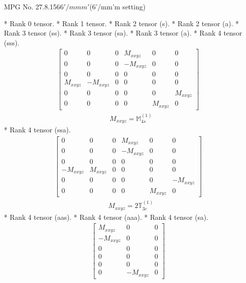 \documentclass[fleqn,8pt,landscape]{jsarticle}
\begin{document}
\setcounter{MaxMatrixCols}{32}

\renewcommand{\tablename}{Table~}
\renewcommand{\figurename}{Figure~}
\begin{center}
\LARGE
MPG No. 27.8.156\quad$6'/mmm'$\quad(6'/mm'm setting)
\end{center}
* Rank 0 tensor.
* Rank 1 tensor.
* Rank 2 tensor (s).
* Rank 2 tensor (a).
* Rank 3 tensor (ss).
* Rank 3 tensor (sa).
* Rank 3 tensor (a).
* Rank 4 tensor (sss).
\begin{align*}
\begin{bmatrix} 0 & 0 & 0 & M_{xxyz} & 0 & 0 \\ 0 & 0 & 0 & - M_{xxyz} & 0 & 0 \\ 0 & 0 & 0 & 0 & 0 & 0 \\ M_{xxyz} & - M_{xxyz} & 0 & 0 & 0 & 0 \\ 0 & 0 & 0 & 0 & 0 & M_{xxyz} \\ 0 & 0 & 0 & 0 & M_{xxyz} & 0 \end{bmatrix}
\end{align*}
\begin{align*}
& M_{xxyz} = \mathbb{M}_{4s}^{(1)}
\end{align*}
* Rank 4 tensor (ssa).
\begin{align*}
\begin{bmatrix} 0 & 0 & 0 & M_{xxyz} & 0 & 0 \\ 0 & 0 & 0 & - M_{xxyz} & 0 & 0 \\ 0 & 0 & 0 & 0 & 0 & 0 \\ - M_{xxyz} & M_{xxyz} & 0 & 0 & 0 & 0 \\ 0 & 0 & 0 & 0 & 0 & - M_{xxyz} \\ 0 & 0 & 0 & 0 & M_{xxyz} & 0 \end{bmatrix}
\end{align*}
\begin{align*}
& M_{xxyz} = 2 \mathbb{T}_{3c}^{(1)}
\end{align*}
* Rank 4 tensor (aas).
* Rank 4 tensor (aaa).
* Rank 4 tensor (sa).
\begin{align*}
\begin{bmatrix} M_{xxyz} & 0 & 0 \\ - M_{xxyz} & 0 & 0 \\ 0 & 0 & 0 \\ 0 & 0 & 0 \\ 0 & 0 & 0 \\ 0 & - M_{xxyz} & 0 \end{bmatrix}
\end{align*}
\end{document}

